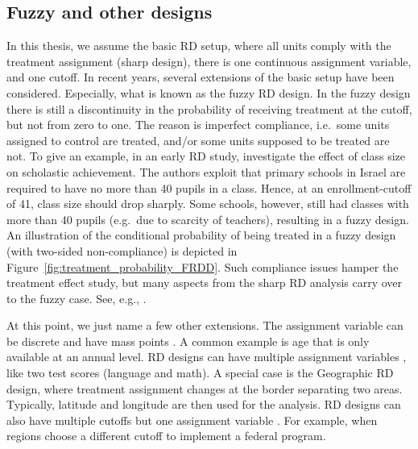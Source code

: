 \subsection{Fuzzy and other designs}  

In this thesis, we assume the basic RD setup, where all units comply with the treatment assignment (sharp design), there is one continuous assignment variable, and one cutoff.
In recent years, several extensions of the basic setup have been considered.
Especially, what is known as the fuzzy RD design.
In the fuzzy design there is still a discontinuity in the probability of receiving treatment at the cutoff, but not from zero to one.
The reason is imperfect compliance, i.e.\ some units assigned to control are treated, and/or some units supposed to be treated are not.
To give an example, in an early RD study, \textcite{Angrist_1999} investigate the effect of class size on scholastic achievement.
The authors exploit that primary schools in Israel are required to have no more than 40 pupils in a class.
Hence, at an enrollment-cutoff of 41, class size should drop sharply.
Some schools, however, still had classes with more than 40 pupils (e.g.\ due to scarcity of teachers), resulting in a fuzzy design.
An illustration of the conditional probability of being treated in a fuzzy design (with two-sided non-compliance) is depicted in Figure~\ref{fig:treatment_probability_FRDD}.
Such compliance issues hamper the treatment effect study, but many aspects from the sharp RD analysis carry over to the fuzzy case.
See, e.g., \textcite{Lee_2010}.

At this point, we just name a few other extensions.
The assignment variable can be discrete and have mass points \parencite{Kolesar_2018}.
A common example is age that is only available at an annual level.
RD designs can have multiple assignment variables \parencite{Papay_2011},
like two test scores (language and math).
A special case is the Geographic RD design, where treatment assignment changes at the border separating two areas.
Typically, latitude and longitude are then used for the analysis.
RD designs can also have multiple cutoffs but one assignment variable \parencite{Cattaneo_2016}.
For example, when regions choose a different cutoff to implement a federal program. 